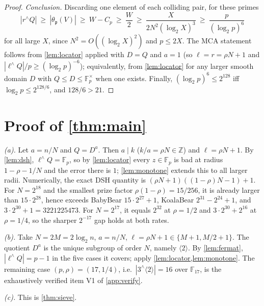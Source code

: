 \documentclass[11pt]{article}
\theoremstyle{definition}
\newcommand{\F}{\mathbb F}
\newcommand{\Z}{\mathbb Z}
\begin{document}
\begin{proof}
\emph{Conclusion.}  Discarding one element of each colliding pair, for these primes
\[
        |r^{\wedge}Q|\ \ge\ |\theta_{\mathfrak p}(V)|\ \ge\ W-C_p\ \ge\ \frac W2
        \ \ge\ \frac{X}{2N^2(\log_2X)^3}
        \ \ge\ \frac{p}{(\log_2p)^6}
\]
for all large $X$, since $N^2=O((\log_2X)^2)$ and $p\le2X$.  The MCA statement follows from \cref{lem:locator} applied with $D=Q$ and $a=1$ (so $\ell=r=\rho N+1$ and $|\ell^{\wedge}Q|/p\ge(\log_2p)^{-6}$); equivalently, from \cref{lem:locator} for any larger smooth domain $D$ with $Q\le D\le\F_p^\times$ when one exists.  Finally, $(\log_2p)^6\le2^{128}$ iff $\log_2p\le2^{128/6}$, and $128/6>21$.
\end{proof}

\section[Proof of the main theorem]{Proof of \cref{thm:main}}

\emph{(a).}  Let $a=n/N$ and $Q=D^a$.  Then $a\mid k$ ($k/a=\rho N\in\Z$) and $\ell=\rho N+1$.  By \cref{lem:dsh}, $\ell^{\wedge}Q=\F_p$, so by \cref{lem:locator} every $z\in\F_p$ is bad at radius $1-\rho-1/N$ and the error there is $1$; \cref{lem:monotone} extends this to all larger radii.  Numerically, the exact DSH quantity is $(\rho N+1)((1-\rho)N-1)+1$.  For $N=2^{18}$ and the smallest prize factor $\rho(1-\rho)=15/256$, it is already larger than $15\cdot2^{28}$, hence exceeds BabyBear $15\cdot2^{27}+1$, KoalaBear $2^{31}-2^{24}+1$, and $3\cdot2^{30}+1=3221225473$.  For $N=2^{17}$, it equals $2^{32}$ at $\rho=1/2$ and $3\cdot2^{30}+2^{16}$ at $\rho=1/4$, so the sharper $2^{-17}$ gap holds at both rates.

\emph{(b).}  Take $N=2M=2\log_2 n$, $a=n/N$, $\ell=\rho N+1\in\{M+1,M/2+1\}$.  The quotient $D^a$ is the unique subgroup of order $N$, namely $\langle2\rangle$.  By \cref{lem:fermat}, $|\ell^{\wedge}Q|=p-1$ in the five cases it covers; apply \cref{lem:locator,lem:monotone}.  The remaining case $(p,\rho)=(17,1/4)$, i.e.\ $|3^{\wedge}\langle2\rangle|=16$ over $\F_{17}$, is the exhaustively verified item V1 of \cref{app:verify}.

\emph{(c).}  This is \cref{thm:sieve}.
\end{document}
